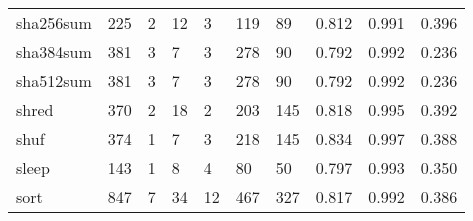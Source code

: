 \begin{longtable}{lp{1.3cm}p{1.3cm}p{1.3cm}p{1.3cm}p{1.3cm}p{1.3cm}p{1.3cm}p{1.3cm}p{1.3cm}}
sha256sum &                    225 &                                  2 &                                12 &                                3 &                               119 &                              89 &                                   0.812 &                                  0.991 &                                0.396 \\
sha384sum &                    381 &                                  3 &                                 7 &                                3 &                               278 &                              90 &                                   0.792 &                                  0.992 &                                0.236 \\
sha512sum &                    381 &                                  3 &                                 7 &                                3 &                               278 &                              90 &                                   0.792 &                                  0.992 &                                0.236 \\
shred     &                    370 &                                  2 &                                18 &                                2 &                               203 &                             145 &                                   0.818 &                                  0.995 &                                0.392 \\
shuf      &                    374 &                                  1 &                                 7 &                                3 &                               218 &                             145 &                                   0.834 &                                  0.997 &                                0.388 \\
sleep     &                    143 &                                  1 &                                 8 &                                4 &                                80 &                              50 &                                   0.797 &                                  0.993 &                                0.350 \\
sort      &                    847 &                                  7 &                                34 &                               12 &                               467 &                             327 &                                   0.817 &                                  0.992 &                                0.386 \\

\end{longtable}
